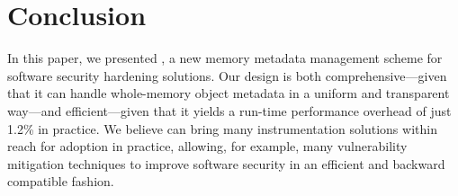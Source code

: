 \vspace{2em}
\section{Conclusion}
\label{sec:conclusion}

In this paper, we presented \projectname{}, a new memory metadata management scheme
for software security hardening solutions.
Our design is both comprehensive---given that it can handle whole-memory object metadata
in a uniform and transparent way---and efficient---given that it yields a run-time performance
overhead of just 1.2\% in practice.
We believe \projectname{} can bring many instrumentation
solutions within reach for adoption in practice,
allowing, for example, many vulnerability mitigation techniques
to improve software security in an efficient and backward compatible fashion.

\begin{comment}
\textbf{Acknowledgment}
This work is supported by the European Research Council through project
ERC-2010-StG 259108-ROSETTA, by the Microsoft Research PhD Scholarship
Programme through the project MRL 2011-049.9, by the Netherlands Organisation
for Scientific Research through grant NWO 639.023.309 VICI ``Dowsing'', and by
the European Commission through the project SHARCS under Grant Agreement No.
644571.
\end{comment}
